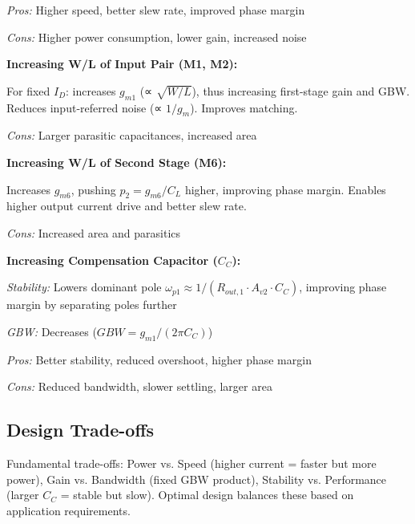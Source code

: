 \documentclass[main.tex]{subfiles}
\begin{document}
\textit{Pros:} Higher speed, better slew rate, improved phase margin

\textit{Cons:} Higher power consumption, lower gain, increased noise

\textbf{Increasing W/L of Input Pair (M1, M2):}

For fixed $I_D$: increases $g_{m1}$ (∝ $\sqrt{W/L}$), thus increasing first-stage gain and GBW. Reduces input-referred noise (∝ $1/g_m$). Improves matching.

\textit{Cons:} Larger parasitic capacitances, increased area

\textbf{Increasing W/L of Second Stage (M6):}

Increases $g_{m6}$, pushing $p_2 = g_{m6}/C_L$ higher, improving phase margin. Enables higher output current drive and better slew rate.

\textit{Cons:} Increased area and parasitics

\textbf{Increasing Compensation Capacitor ($C_C$):}

\textit{Stability:} Lowers dominant pole $\omega_{p1} \approx 1/(R_{out,1} \cdot A_{v2} \cdot C_C)$, improving phase margin by separating poles further

\textit{GBW:} Decreases ($GBW = g_{m1}/(2\pi C_C)$)

\textit{Pros:} Better stability, reduced overshoot, higher phase margin

\textit{Cons:} Reduced bandwidth, slower settling, larger area

\subsection*{Design Trade-offs}

Fundamental trade-offs: Power vs. Speed (higher current = faster but more power), Gain vs. Bandwidth (fixed GBW product), Stability vs. Performance (larger $C_C$ = stable but slow). Optimal design balances these based on application requirements.
\end{document}
